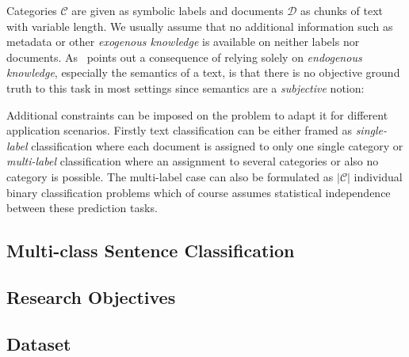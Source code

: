 Categories $\mathcal{C}$ are given as symbolic labels and documents $\mathcal{D}$ as chunks of text with variable length. We usually assume that no additional information such as metadata or other \emph{exogenous knowledge} is available on neither labels nor documents.
As~\cite{Sebastiani:2002aa} points out a consequence of relying solely on \emph{endogenous knowledge}, especially the semantics of a text, is that there is no objective ground truth to this task in most settings since semantics are a \emph{subjective} notion: ~\cite{Sebastiani:2002aa}

Additional constraints can be imposed on the problem to adapt it for different application scenarios. Firstly text classification can be either framed as \emph{single-label} classification where each document is assigned to only one single category or \emph{multi-label} classification where an assignment to several categories or also no category is possible. The multi-label case can also be formulated as $|\mathcal{C}|$ individual binary classification problems which of course assumes statistical independence between these prediction tasks.


\subsection{Multi-class Sentence Classification}
\label{subs:Multi-class Sentence Classification}

\subsection{Research Objectives}
\label{subs:Research Objective}

\subsection{Dataset}
\label{subs:Dataset}
